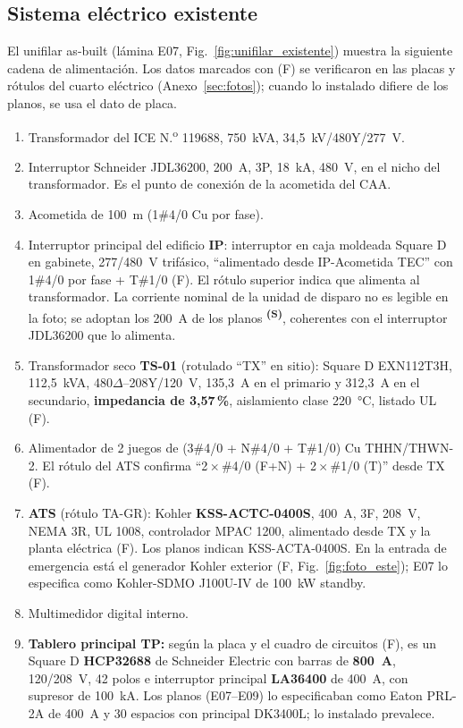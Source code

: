 \documentclass[12pt]{article}
\newcommand{\supuesto}{\textsuperscript{\textcolor{orange!80!black}{\textbf{(S)}}}}
\begin{document}
\subsection{Sistema eléctrico existente}
\label{sec:existente}
El unifilar as-built (lámina E07, Fig.~\ref{fig:unifilar_existente}) muestra la siguiente cadena de alimentación. Los datos marcados con (F) se verificaron en las placas y rótulos del cuarto eléctrico (Anexo~\ref{sec:fotos}); cuando lo instalado difiere de los planos, se usa el dato de placa.
\begin{enumerate}
\item Transformador del ICE N.\textsuperscript{o} 119688, 750~kVA, 34,5~kV/480Y/277~V.
\item Interruptor Schneider JDL36200, 200~A, 3P, 18~kA, 480~V, en el nicho del transformador. Es el punto de conexión de la acometida del CAA.
\item Acometida de 100~m (1\#4/0 Cu por fase).
\item Interruptor principal del edificio \textbf{IP}: interruptor en caja moldeada Square D en gabinete, 277/480~V trifásico, ``alimentado desde IP-Acometida TEC'' con 1\#4/0 por fase + T\#1/0 (F). El rótulo superior indica que alimenta al transformador. La corriente nominal de la unidad de disparo no es legible en la foto; se adoptan los 200~A de los planos \supuesto{}, coherentes con el interruptor JDL36200 que lo alimenta.
\item Transformador seco \textbf{TS-01} (rotulado ``TX'' en sitio): Square D EXN112T3H, 112,5~kVA, 480$\Delta$--208Y/120~V, 135,3~A en el primario y 312,3~A en el secundario, \textbf{impedancia de 3,57\,\%}, aislamiento clase 220~°C, listado UL (F).
\item Alimentador de 2 juegos de (3\#4/0 + N\#4/0 + T\#1/0) Cu THHN/THWN-2. El rótulo del ATS confirma ``2\,$\times$\,\#4/0 (F+N) + 2\,$\times$\,\#1/0 (T)'' desde TX (F).
\item \textbf{ATS} (rótulo TA-GR): Kohler \textbf{KSS-ACTC-0400S}, 400~A, 3F, 208~V, NEMA 3R, UL 1008, controlador MPAC 1200, alimentado desde TX y la planta eléctrica (F). Los planos indican KSS-ACTA-0400S. En la entrada de emergencia está el generador Kohler exterior (F, Fig.~\ref{fig:foto_este}); E07 lo especifica como Kohler-SDMO J100U-IV de \SI{100}{\kilo\watt} standby.
\item Multimedidor digital interno.
\item \textbf{Tablero principal TP:} según la placa y el cuadro de circuitos (F), es un Square D \textbf{HCP32688} de Schneider Electric con barras de \textbf{800~A}, 120/208~V, 42 polos e interruptor principal \textbf{LA36400} de 400~A, con supresor de 100~kA. Los planos (E07--E09) lo especificaban como Eaton PRL-2A de 400~A y 30 espacios con principal DK3400L; lo instalado prevalece.
\end{enumerate}
\end{document}
